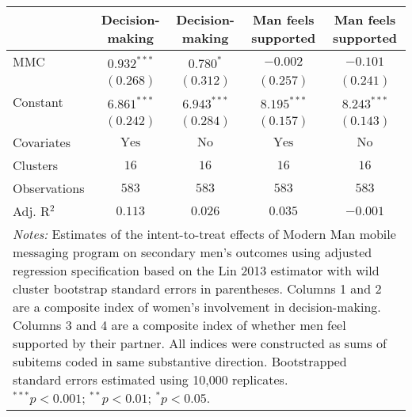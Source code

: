 
\begin{tabular}{l c c c c}
\toprule
 & Decision-making & Decision-making & Man feels supported & Man feels supported \\
\midrule
MMC          & $0.932^{***}$  & $0.780^{*}$   & $-0.002$       & $-0.101$      \\
             & $(0.268)$      & $(0.312)$     & $(0.257)$      & $(0.241)$     \\
Constant     & $6.861^{***}$  & $6.943^{***}$ & $8.195^{***}$  & $8.243^{***}$ \\
             & $(0.242)$      & $(0.284)$     & $(0.157)$      & $(0.143)$     \\
\midrule
Covariates   & $\textrm{Yes}$ & $\textrm{No}$ & $\textrm{Yes}$ & $\textrm{No}$ \\
Clusters     & $16$           & $16$          & $16$           & $16$          \\
Observations & $583$          & $583$         & $583$          & $583$         \\
Adj. R$^2$   & $0.113$        & $0.026$       & $0.035$        & $-0.001$      \\
\bottomrule
\multicolumn{5}{l}{\scriptsize{\parbox{\linewidth}{\vspace{2pt}
       \textit{Notes:} Estimates of the intent-to-treat effects of Modern Man mobile
       messaging program on secondary men's outcomes using adjusted regression
       specification based on the Lin 2013 estimator with wild cluster bootstrap
       standard errors in parentheses. Columns 1 and 2 are a composite index of
       women's involvement in decision-making. Columns 3 and 4 are a composite index of 
       whether men feel supported by their partner. All indices were constructed as sums of 
       subitems coded in same substantive direction. Bootstrapped standard errors estimated 
       using 10,000 replicates. \\ $^{***}p<0.001$; $^{**}p<0.01$; $^{*}p<0.05$.}}}
\end{tabular}

